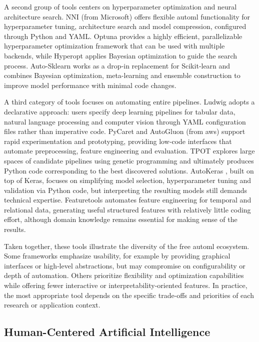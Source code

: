 \documentclass[twoside,final]{Contexto}
\begin{document}
A second group of tools centers on hyperparameter optimization and neural architecture search. NNI \cite{nni} (from Microsoft) offers flexible \gls{automl} functionality for hyperparameter tuning, architecture search and model compression, configured through Python and YAML. Optuna \cite{optuna} provides a highly efficient, parallelizable hyperparameter optimization framework that can be used with multiple backends, while Hyperopt applies Bayesian optimization to guide the search process. Auto-Sklearn \cite{autosklearn} works as a drop‑in replacement for Scikit‑learn and combines Bayesian optimization, meta-learning and ensemble construction to improve model performance with minimal code changes.

A third category of tools focuses on automating entire pipelines. Ludwig \cite{ludwig} adopts a declarative approach: users specify deep learning pipelines for tabular data, natural language processing and computer vision through YAML configuration files rather than imperative code. PyCaret \cite{pycaret} and AutoGluon \cite{autogluon} (from \gls{aws}) support rapid experimentation and prototyping, providing low‑code interfaces that automate preprocessing, feature engineering and evaluation. TPOT \cite{tpot} explores large spaces of candidate pipelines using genetic programming and ultimately produces Python code corresponding to the best discovered solutions. AutoKeras \cite{autokeras}, built on top of Keras, focuses on simplifying model selection, hyperparameter tuning and validation via Python code, but interpreting the resulting models still demands technical expertise. Featuretools \cite{featuretools} automates feature engineering for temporal and relational data, generating useful structured features with relatively little coding effort, although domain knowledge remains essential for making sense of the results.

Taken together, these tools illustrate the diversity of the free \gls{automl} ecosystem. Some frameworks emphasize usability, for example by providing graphical interfaces or high‑level abstractions, but may compromise on configurability or depth of automation. Others prioritize flexibility and optimization capabilities while offering fewer interactive or interpretability-oriented features. In practice, the most appropriate tool depends on the specific trade-offs and priorities of each research or application context.

\subsection{Human-Centered Artificial Intelligence}
\label{subsec:hcai}
\end{document}
